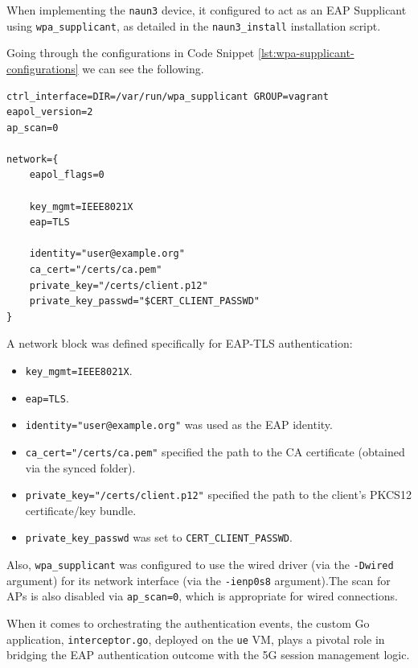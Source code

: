 When implementing the \texttt{naun3} device, it configured to act as an \ac{EAP} Supplicant using \texttt{wpa\_supplicant}, as detailed in the \texttt{naun3\_install} installation script.

Going through the configurations in Code Snippet \ref{lst:wpa-supplicant-configurations} we can see the following.

\begin{lstlisting}[caption=wpa\_supplicant configurations,label={lst:wpa-supplicant-configurations}]
ctrl_interface=DIR=/var/run/wpa_supplicant GROUP=vagrant
eapol_version=2
ap_scan=0

network={
    eapol_flags=0

    key_mgmt=IEEE8021X
    eap=TLS

    identity="user@example.org"
    ca_cert="/certs/ca.pem"
    private_key="/certs/client.p12"
    private_key_passwd="$CERT_CLIENT_PASSWD"
}
\end{lstlisting}

A network block was defined specifically for \ac{EAP-TLS} authentication:

\begin{itemize}
    \item \texttt{key\_mgmt=IEEE8021X}.
    \item \texttt{eap=TLS}.
    \item \texttt{identity="user@example.org"} was used as the \ac{EAP} identity.
    \item \texttt{ca\_cert="/certs/ca.pem"} specified the path to the \ac{CA} certificate (obtained via the synced folder).
    \item \texttt{private\_key="/certs/client.p12"} specified the path to the client's \ac{PKCS12} certificate/key bundle.
    \item \texttt{private\_key\_passwd} was set to \texttt{CERT\_CLIENT\_PASSWD}.
\end{itemize}

Also, \texttt{wpa\_supplicant} was configured to use the wired driver (via the \texttt{-Dwired} argument) for its network interface (via the \texttt{-ienp0s8} argument).The scan for \acp{AP} is also disabled via \texttt{ap\_scan=0}, which is appropriate for wired connections.

When it comes to orchestrating the authentication events, the custom Go application, \texttt{interceptor.go}, deployed on the \texttt{ue} \ac{VM}, plays a pivotal role in bridging the \ac{EAP} authentication outcome with the \ac{5G} session management logic.

